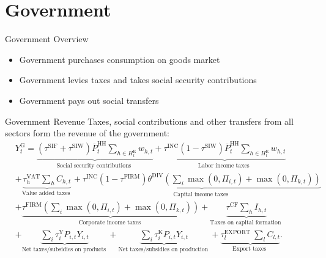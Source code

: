\documentclass[9pt]{beamer}
\begin{document}
\section{Government}
\begin{frame}{Government Overview}
\label{Government}

    \begin{itemize}
        \item Government purchases consumption on goods market
        \item Government levies taxes and takes social security contributions
        \item Government pays out social transfers
    \end{itemize}
       \hyperlink{ReturnOverview}{}

\end{frame}
\begin{frame}{Government Revenue}
    Taxes, social contributions and other transfers from all sectors form the revenue of the government:
    \small
\begin{equation}
\begin{aligned}
& Y^{\mathrm{G}}_t=\underbrace{\left(\tau^{\mathrm{SIF}}+\tau^{\mathrm{SIW}}\right) \bar{P}^{\mathrm{HH}}_t\sum_{h \in H^{\mathrm{E}}_t} w_{h,t}}_{\text {Social security contributions }}+\underbrace{\tau^{\mathrm{INC}}\left(1-\tau^{\mathrm{SIW}}\right) \bar{P}^{\mathrm{HH}}_t \sum_{h \in H^{\mathrm{E}}_t} w_{h,t}}_{\text {Labor income taxes }} \\
& +\underbrace{\tau_h^{\mathrm{VAT}} \sum_h C_{h,t}}_{\text {Value added taxes }}+\underbrace{\tau^{\mathrm{INC}}\left(1-\tau^{\mathrm{FIRM}}\right) \theta^{\mathrm{DIV}}\left(\sum_i \max \left(0, \Pi_{i,t}\right)+\max \left(0, \Pi_{k,t}\right)\right)}_{\text {Capital income taxes }} \\
& +\underbrace{\tau^{\mathrm{FIRM}}\left(\sum_i \max \left(0, \Pi_{i,t}\right)+\max \left(0, \Pi_{k,t}\right)\right)}_{\text {Corporate income taxes }}+\underbrace{\tau^{\mathrm{CF}} \sum_h I_{h,t}}_{\text {Taxes on capital formation }} \\
& +\underbrace{\sum_i \tau_i^{\mathrm{Y}} P_{i,t} Y_{i,t}}_{\text {Net taxes/subsidies on products }}+\underbrace{\sum_i \tau_i^{\mathrm{K}} P_{i,t} Y_{i,t}}_{\text {Net taxes/subsidies on production }}+\underbrace{\tau_l^{\text {EXPORT }} \sum_l C_{l,t}}_{\text {Export taxes }} . \\
&
\end{aligned}
\end{equation}
\normalsize
    \hyperlink{ReturnOverview}{}
\end{frame}
\end{document}
